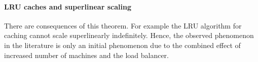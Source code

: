  \paragraph*{LRU caches and superlinear scaling}
\begin{observation}
 There are consequences of this theorem. For example the LRU algorithm for caching cannot scale superlinearly indefinitely. Hence, the observed phenomenon in the literature is only an initial phenomenon due to the combined effect of increased number of machines and the load balancer.
\end{observation}



\begin{comment}
\newpage
\newpage
\newpage


Let $r'$ be a normalized value of $r$ with respect to the total non-serial work of the system. 


\begin{equation*}
  S(k) = \frac{T(1)}{T(k)} = \frac1{s + \frac{1-s - r'}{k}} \enspace ,
\end{equation*}
By setting $\ell = \frac{(1-s)\cdot k}{1-s-r'}$, we obtain the following theorem.

\begin{theorem}
	\label{thm:superlinear}

	For parallel lists, scaling can be up to
	Then, for any number of machines $k$, the scaling of the distributed is 
	\begin{equation*}
	  S(k) = \frac{T(1)}{T(k)} = \frac1{s + \frac{1-s}{k \cdot \ell}} \enspace ,
	\end{equation*}
	for values of $k<k_0$, where $k_0$ depends on an input sequence $\sigma$.
\end{theorem}

\begin{proof}
	Consider an input $\sigma$ that requests selected $k$ items of the universe in a round-robin fashion and repeats an arbitrarily large number of times $m$.
	The baseline $T(1)$ finishes the schedule in time $T(1) = 1$.

Consider $k$ machines. We construct a load balancer $f_k$.
First, we construct an auxiliary graph $G$ of $k$ vertices, where each vertex represents a machine. The graph is weighted, and each edge $(M_i, M_j)$ has the cost that is saved by isolating affinity domains between these two machines. For the special case of $\sigma$, this graph is a complete graph with equal weights.
Consider an ideal load balancer $f_k$ that isolates the affinity domains of all items from $\sigma$ by an arbitrary $k$-cut (components of size $k$)\cite{Frieze97, Mahajan95}. The total savings per each machine amount to $m\cdot(k-1)$.
Then, the distributed system pays $1$ for handling each request in the list lookup model, as opposed to $\Omega(k)$ of the baseline (all items are in the working set, and the function $g_D$ is linear).


\end{comment}
